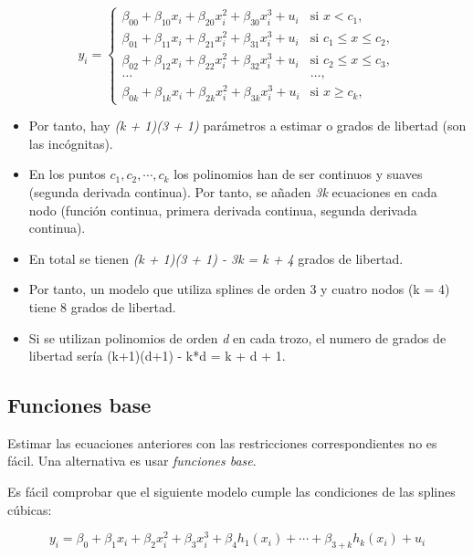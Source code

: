 \documentclass[
]{article}
\begin{document}
\[
\begin{equation*}
y_i = 
\begin{cases}
\beta_{00} + \beta_{10} x_i + \beta_{20} x_i^2 + \beta_{30} x_i^3 + u_i & \text{si } x < c_1,\\
\beta_{01} + \beta_{11} x_i + \beta_{21} x_i^2 + \beta_{31} x_i^3 + u_i & \text{si } c_1 \leq x \leq c_2, \\
\beta_{02} + \beta_{12} x_i + \beta_{22} x_i^2 + \beta_{32} x_i^3 + u_i & \text{si } c_2 \leq x \leq c_3, \\
\ldots & \ldots, \\
\beta_{0k} + \beta_{1k} x_i + \beta_{2k} x_i^2 + \beta_{3k} x_i^3 + u_i & \text{si } x \geq c_k,
\end{cases}
\end{equation*}
\]

\begin{itemize}
\item
  Por tanto, hay \emph{(k + 1)(3 + 1)} parámetros a estimar o grados de
  libertad (son las incógnitas).
\item
  En los puntos \(c_1, c_2, \cdots, c_k\) los polinomios han de ser
  continuos y suaves (segunda derivada continua). Por tanto, se añaden
  \emph{3k} ecuaciones en cada nodo (función continua, primera derivada
  continua, segunda derivada continua).
\item
  En total se tienen \emph{(k + 1)(3 + 1) - 3k = k + 4} grados de
  libertad.
\item
  Por tanto, un modelo que utiliza splines de orden 3 y cuatro nodos (k
  = 4) tiene 8 grados de libertad.
\item
  Si se utilizan polinomios de orden \emph{d} en cada trozo, el numero
  de grados de libertad sería (k+1)(d+1) - k*d = k + d + 1.
\end{itemize}

\hypertarget{funciones-base}{%
\subsection{Funciones base}\label{funciones-base}}

Estimar las ecuaciones anteriores con las restricciones correspondientes
no es fácil. Una alternativa es usar \emph{funciones base}.

Es fácil comprobar que el siguiente modelo cumple las condiciones de las
splines cúbicas:

\[
y_i = \beta_0 + \beta_1 x_i + \beta_2 x_i^2 + \beta_3 x_i^3  + \beta_{4} h_1(x_i) + \cdots + \beta_{3+k} h_k(x_i) + u_i
\]
\end{document}
